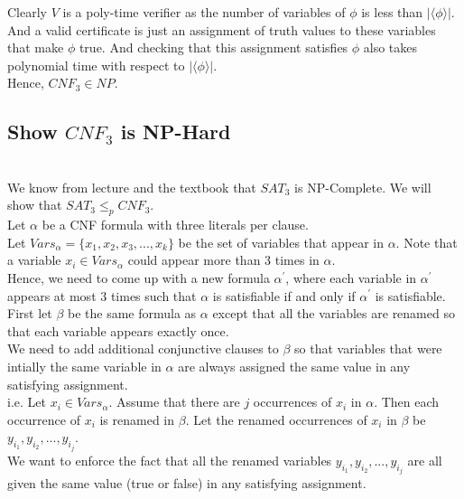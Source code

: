 \documentclass[12pt]{article}
\begin{document}
Clearly $V$ is a poly-time verifier as the number of variables of $\phi$ is less than $|\langle \phi \rangle|$. And a valid certificate is just an assignment of truth values to these variables that make $\phi$ true. And checking that this assignment satisfies $\phi$ also takes polynomial time with respect to $|\langle \phi \rangle|$. \\

Hence, $CNF_3 \in NP$. 

\subsection*{Show $CNF_3$ is NP-Hard} \\

We know from lecture and the textbook that $SAT_3$ is NP-Complete. We will show that $SAT_3 \leq_p CNF_3$. \\

Let $\alpha$ be a CNF formula with three literals per clause. \\

Let $Vars_{\alpha} = \{x_1,x_2,x_3,...,x_k\}$ be the set of variables that appear in $\alpha$. Note that a variable $x_i \in Vars_{\alpha}$ could appear more than 3 times in $\alpha$. \\

Hence, we need to come up with a new formula $\alpha^\prime$, where each variable in $\alpha^\prime$ appears at most 3 times such that $\alpha$ is satisfiable if and only if $\alpha^\prime$ is satisfiable. \\

First let $\beta$ be the same formula as $\alpha$ except that all the variables are renamed so that each variable appears exactly once. \\

We need to add additional conjunctive clauses to $\beta$ so that variables that were intially the same variable in $\alpha$ are always assigned the same value in any satisfying assignment. \\

i.e. Let $x_i \in Vars_{\alpha}$. Assume that there are $j$ occurrences of $x_i$ in $\alpha$. Then each occurrence of $x_i$ is renamed in $\beta$. Let the renamed occurrences of $x_i$ in $\beta$ be $y_{i_{1}},y_{i_2},...,y_{i_j}$. \\

We want to enforce the fact that all the renamed variables $y_{i_{1}},y_{i_2},...,y_{i_j}$ are all given the same value (true or false) in any satisfying assignment. \\
\end{document}
